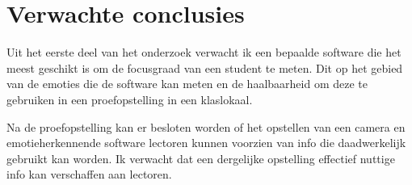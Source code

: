 \section{Verwachte conclusies}
\label{sec:verwachte_conclusies}


Uit het eerste deel van het onderzoek verwacht ik een bepaalde software die het meest geschikt is om de focusgraad van een student te meten. Dit op het gebied van de emoties die de software kan meten en de haalbaarheid om deze te gebruiken in een proefopstelling in een klaslokaal.

Na de proefopstelling kan er besloten worden of het opstellen van een camera en emotieherkennende software lectoren kunnen voorzien van info die daadwerkelijk gebruikt kan worden. Ik verwacht dat een dergelijke opstelling effectief nuttige info kan verschaffen aan lectoren.